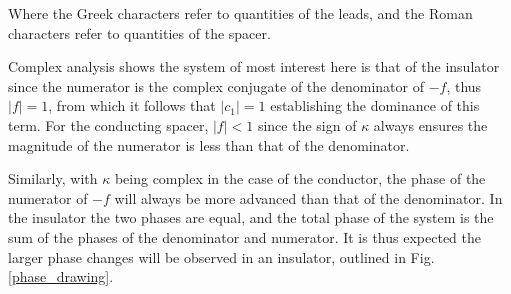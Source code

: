 \documentclass[a4paper, 12pt]{article}
\begin{document}
Where the Greek characters refer to quantities of the leads, and the Roman characters refer to quantities of the spacer.
\par Complex analysis shows the system of most interest here is that of the insulator since the numerator is the complex conjugate of the denominator of $-f$, thus $|f|=1$, from which it follows that $|c_1| = 1$ establishing the dominance of this term. For the conducting spacer, $|f|<1$ since the sign of $\kappa$ always ensures the magnitude of the numerator is less than that of the denominator.
\par Similarly, with $\kappa$ being complex in the case of the conductor, the phase of the numerator of $-f$ will always be more advanced than that of the denominator. In the insulator the two phases are equal, and the total phase of the system is the sum of the phases of the denominator and numerator. It is thus expected the larger phase changes will be observed in an insulator, outlined in Fig. \ref{phase_drawing}.
\end{document}
